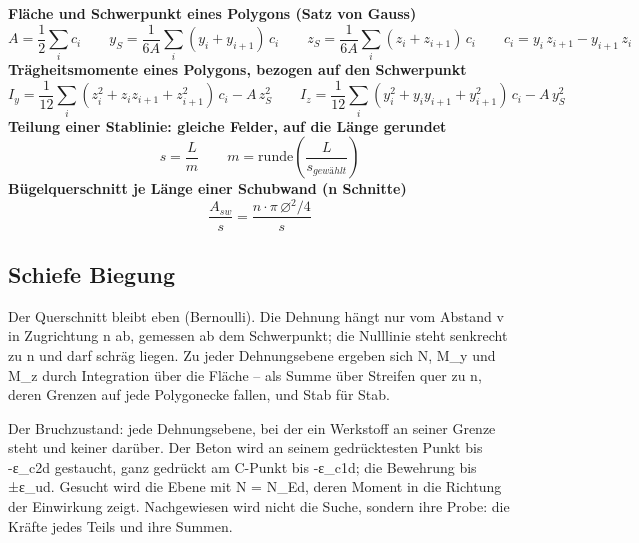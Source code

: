 \documentclass[11pt,a4paper]{article}
\begin{document}
\noindent\textbf{Fläche und Schwerpunkt eines Polygons (Satz von Gauss)}
\begin{equation*}
A = \frac{1}{2} \sum_i c_i \qquad y_S = \frac{1}{6A} \sum_i (y_i + y_{i+1})\, c_i \qquad z_S = \frac{1}{6A} \sum_i (z_i + z_{i+1})\, c_i \qquad c_i = y_i\, z_{i+1} - y_{i+1}\, z_i
\end{equation*}
\noindent\textbf{Trägheitsmomente eines Polygons, bezogen auf den Schwerpunkt}
\begin{equation*}
I_y = \frac{1}{12} \sum_i (z_i^2 + z_i z_{i+1} + z_{i+1}^2)\, c_i - A\, z_S^2\qquad I_z = \frac{1}{12} \sum_i (y_i^2 + y_i y_{i+1} + y_{i+1}^2)\, c_i - A\, y_S^2
\end{equation*}
\noindent\textbf{Teilung einer Stablinie: gleiche Felder, auf die Länge gerundet}
\begin{equation*}
s = \frac{L}{m} \qquad m = \mathrm{runde}\left(\frac{L}{s_{gewählt}}\right)
\end{equation*}
\noindent\textbf{Bügelquerschnitt je Länge einer Schubwand (n Schnitte)}
\begin{equation*}
\frac{A_{sw}}{s} = \frac{n \cdot \pi\, \varnothing^2 / 4}{s}
\end{equation*}
\subsection{Schiefe Biegung}
Der Querschnitt bleibt eben (Bernoulli). Die Dehnung hängt nur vom Abstand v in Zugrichtung n ab, gemessen ab dem Schwerpunkt; die Nulllinie steht senkrecht zu n und darf schräg liegen. Zu jeder Dehnungsebene ergeben sich N, M\_y und M\_z durch Integration über die Fläche – als Summe über Streifen quer zu n, deren Grenzen auf jede Polygonecke fallen, und Stab für Stab.

Der Bruchzustand: jede Dehnungsebene, bei der ein Werkstoff an seiner Grenze steht und keiner darüber. Der Beton wird an seinem gedrücktesten Punkt bis -ε\_c2d gestaucht, ganz gedrückt am C-Punkt bis -ε\_c1d; die Bewehrung bis ±ε\_ud. Gesucht wird die Ebene mit N = N\_Ed, deren Moment in die Richtung der Einwirkung zeigt. Nachgewiesen wird nicht die Suche, sondern ihre Probe: die Kräfte jedes Teils und ihre Summen.
\end{document}
